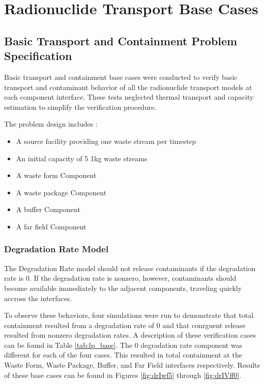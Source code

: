 \section{Radionuclide Transport Base Cases}\label{sec:nuclide_base_cases}
\subsection{Basic Transport and Containment Problem Specification}
Basic transport and containment base cases were conducted to verify basic 
transport and contaminant behavior of all the radionuclide transport models at 
each component interface. These tests neglected thermal transport and capacity 
estimation to simplify the verification procedure.  

The problem design includes : 
\begin{itemize}
\item{A source facility providing one waste stream per timestep}
\item{An initial capacity of 5 1kg waste streams}
\item{A waste form Component} 
\item{A waste package Component}
\item{A buffer Component}
\item{A far field Component}
\end{itemize}

\subsubsection{Degradation Rate Model}
The Degradation Rate model should not release contaminants if the degradation 
rate is 0. If the degradation rate is nonzero, however, contaminants should 
become available immediately to the adjacent components, traveling quickly 
accross the interfaces. 

To observe these behaviors, four simulations were run to demonstrate that total 
containment resulted from a degradation rate of 0 and that conrguent release 
resulted from nonzero degradation rates. A description of these verification 
cases can be found in Table \ref{tab:lp_base}. The 0 degradation rate component was 
different for each of the four cases. This resulted in total containment at the 
Waste Form, Waste Package, Buffer, and Far Field interfaces respectively. 
Results of these base cases can be found in Figures 
\ref{fig:drIwf5} through \ref{fig:drIVff0}.
\FloatBarrier


\FloatBarrier

